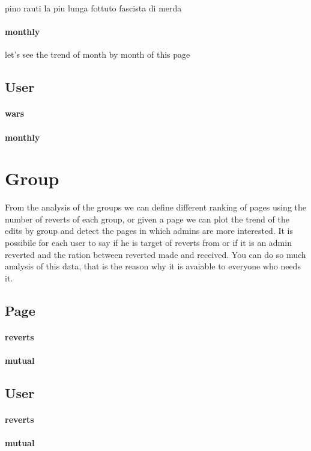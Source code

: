 pino rauti la piu lunga fottuto fascista di merda 

\paragraph*{monthly}
let's see the trend of month by month of this page 
\subsection{User}
\paragraph*{wars}
\paragraph*{monthly}



\section{Group}
From the analysis of the groups we can define different ranking of pages using the number of reverts
of each group, or given a page we can plot the trend of the edits by group and detect the pages in
which admins are more interested. It is possibile for each user to say if he is target of reverts
from or if it is an admin reverted and the ration between reverted made and received. You can do so
much analysis of this data, that is the reason why it is avaiable to everyone who needs it. 

\subsection{Page}
\paragraph*{reverts}
\paragraph*{mutual}
\subsection{User}
\paragraph*{reverts}
\paragraph*{mutual}






